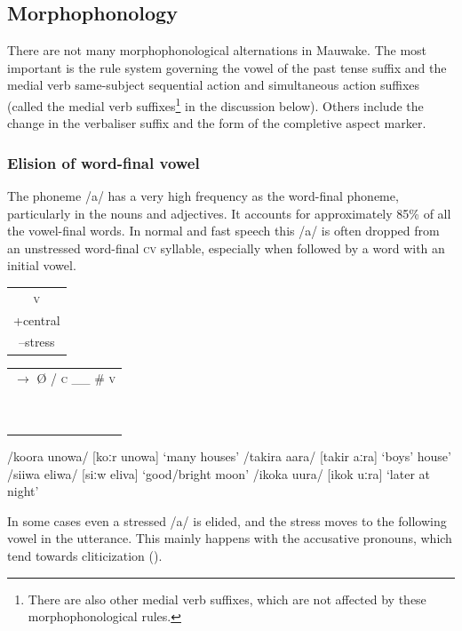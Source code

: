 \subsection{Morphophonology}\label{sec:2.3.3}

There are not many morphophonological alternations in Mauwake.  The most important is the rule system governing the vowel of the past tense suffix and the medial verb same-subject sequential action and simultaneous action suffixes (called the medial verb suffixes\footnote{There are also other medial verb suffixes, which are not  affected by these morphophonological rules.} in the discussion below).  Others include the change in the verbaliser suffix and the form of the completive aspect marker.

\subsubsection{Elision of word-final vowel}\label{sec:2:z:y:x}

The phoneme /a/ has a very high frequency as the word-final phoneme, particularly in the nouns and adjectives.  It accounts for approximately 85\% of all the vowel-final words.  In normal and fast speech this /a/ is often dropped from an unstressed word-final \textsc{cv} syllable, especially when followed by a word with an initial vowel. 

\ea
\begin{tabular}{c}\textsc{v}\\+central\\--stress\\    \end{tabular}
\begin{tabular}{c}    $\rightarrow $ {\O}  /  \textsc{c} \_\_  \#  \textsc{v} \\~\\~\\    \end{tabular}
\z

\ea
\ea
/koora unowa/  [{{\textprimstress}koːr  u{{\textprimstress}}nowa}]  `many houses'
\ex
/takira {\textphi}aara/  [ta{{\textprimstress}kir  {{\textprimstress}}}{\textphi}aːra]  `boys' house'
\ex
/siiwa eliwa/  [{{\textprimstress}siːw  e{{\textprimstress}}liva}]  `good/bright moon'
\ex
/ikoka uura/  [i{{\textprimstress}kok  {{\textprimstress}}uːra}]  `later at night'
\z
\z

In some cases even a stressed /a/ is elided, and the stress moves to the following vowel in the utterance.  This mainly happens with the accusative pronouns, which tend towards cliticization ().

